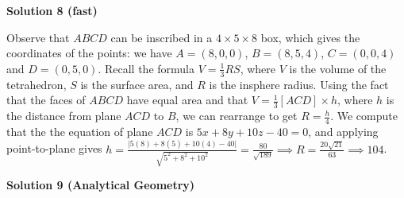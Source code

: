 \begin{enumerate}
 



\textbf{Solution 8 (fast)}

Observe that $ABCD$ can be inscribed in a $4\times5\times8$ box, which gives the coordinates of the points: we have $A=(8,0,0)$, $B=(8,5,4)$, $C=(0,0,4)$ and $D=(0,5,0)$. Recall the formula $V=\frac{1}{3}RS$, where $V$ is the volume of the tetrahedron, $S$ is the surface area, and $R$ is the insphere radius. Using the fact that the faces of $ABCD$ have equal area and that $V=\frac{1}{3}[ACD] \times h$, where $h$ is the distance from plane $ACD$ to $B$, we can rearrange to get $R=\frac{h}{4}$. We compute that the the equation of plane $ACD$ is $5x+8y+10z-40=0$, and applying point-to-plane gives $h=\frac{\vert 5(8)+8(5)+10(4)-40 \vert}{\sqrt{5^2+8^2+10^2}}=\frac{80}{\sqrt{189}} \implies R=\frac{20\sqrt{21}}{63} \implies \boxed{104}$.

 



\textbf{Solution 9 (Analytical Geometry)}


\end{enumerate}

